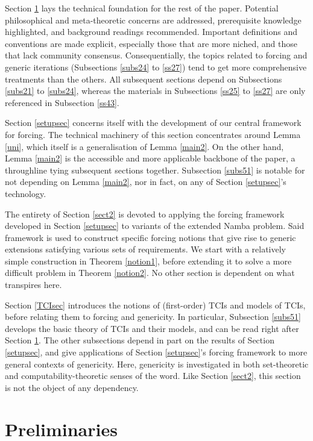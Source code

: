 \documentclass[12pt]{article}
\numberwithin{equation}{section}
\begin{document}
Section \ref{sect15} lays the technical foundation for the rest of the paper. Potential philosophical and meta-theoretic concerns are addressed, prerequisite knowledge highlighted, and background readings recommended. Important definitions and conventions are made explicit, especially those that are more niched, and those that lack community consensus. Consequentially, the topics related to forcing and generic iterations (Subsections \ref{subs24} to \ref{ss27}) tend to get more comprehensive treatments than the others. All subsequent sections depend on Subsections \ref{subs21} to \ref{subs24}, whereas the materials in Subsections \ref{ss25} to \ref{ss27} are only referenced in Subsection \ref{ss43}.

Section \ref{setupsec} concerns itself with the development of our central framework for forcing. The technical machinery of this section concentrates around Lemma \ref{uni}, which itself is a generalisation of Lemma \ref{main2}. On the other hand, Lemma \ref{main2} is the accessible and more applicable backbone of the paper, a throughline tying subsequent sections together. Subsection \ref{subs51} is notable for not depending on Lemma \ref{main2}, nor in fact, on any of Section \ref{setupsec}'s technology.

The entirety of Section \ref{sect2} is devoted to applying the forcing framework developed in Section \ref{setupsec} to variants of the extended Namba problem. Said framework is used to construct specific forcing notions that give rise to generic extensions satisfying various sets of requirements. We start with a relatively simple construction in Theorem \ref{notion1}, before extending it to solve a more difficult problem in Theorem \ref{notion2}. No other section is dependent on what transpires here.

Section \ref{TCIsec} introduces the notions of (first-order) TCIs and models of TCIs, before relating them to forcing and genericity. In particular, Subsection \ref{subs51} develops the basic theory of TCIs and their models, and can be read right after Section \ref{sect15}. The other subsections depend in part on the results of Section \ref{setupsec}, and give applications of Section \ref{setupsec}'s forcing framework to more general contexts of genericity. Here, genericity is investigated in both set-theoretic and computability-theoretic senses of the word. Like Section \ref{sect2}, this section is not the object of any dependency.

\section{Preliminaries}\label{sect15}
\end{document}
